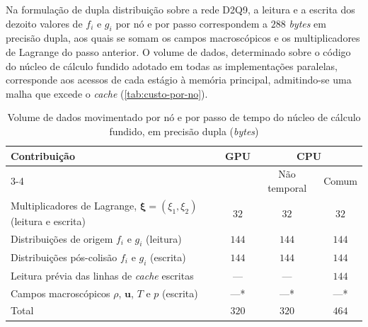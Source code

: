 Na formulação de dupla distribuição sobre a rede D2Q9, a leitura e a escrita dos dezoito valores de $f_i$ e $g_i$ por nó e por passo correspondem a $288$ \textit{bytes} em precisão dupla, aos quais se somam os campos macroscópicos e os multiplicadores de Lagrange do passo anterior.
O volume de dados, determinado sobre o código do núcleo de cálculo fundido adotado em todas as implementações paralelas, corresponde aos acessos de cada estágio à memória principal, admitindo-se uma malha que excede o \textit{cache} (\autoref{tab:custo-por-no}).

\begin{table}[H]
    \centering
    \caption{Volume de dados movimentado por nó e por passo de tempo do núcleo de cálculo fundido, em precisão dupla (\textit{bytes})}
    \label{tab:custo-por-no}
    \small
    \begin{tabular}{p{7.4cm}ccc}
        \toprule
        Contribuição & GPU & \multicolumn{2}{c}{CPU} \\
        \cmidrule(lr){3-4}
        & & Não temporal & Comum \\
        \midrule
        Multiplicadores de Lagrange, $\boldsymbol{\xi} = (\xi_1, \xi_2)$ (leitura e escrita) & $32$  & $32$  & $32$ \\
        Distribuições de origem $f_i$ e $g_i$ (leitura)                                      & $144$ & $144$ & $144$ \\
        Distribuições pós-colisão $f_i$ e $g_i$ (escrita)                                    & $144$ & $144$ & $144$ \\
        Leitura prévia das linhas de \textit{cache} escritas                                 & ---   & ---   & $144$ \\
        Campos macroscópicos $\rho$, $\mathbf{u}$, $T$ e $p$ (escrita)                       & ---*  & ---*  & ---* \\
        \midrule
        Total                                                                                & $320$ & $320$ & $464$ \\
        \bottomrule
    \end{tabular}
\end{table}

